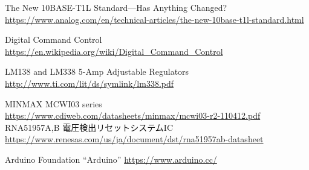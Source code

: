 \begin{thebibliography}{2}
  The New 10BASE-T1L Standard—Has Anything Changed?
  \url{https://www.analog.com/en/technical-articles/the-new-10base-t1l-standard.html}

Digital Command Control
\url{https://en.wikipedia.org/wiki/Digital_Command_Control}

  LM138 and LM338 5-Amp Adjustable Regulators
  \url{http://www.ti.com/lit/ds/symlink/lm338.pdf}

  MINMAX MCWI03 series
  \url{https://www.cdiweb.com/datasheets/minmax/mcwi03-r2-110412.pdf}
  RNA51957A,B 電圧検出リセットシステムIC
  \url{https://www.renesas.com/us/ja/document/dst/rna51957ab-datasheet}

  Arduino Foundation ``Arduino''
  \url{https://www.arduino.cc/}


\end{thebibliography}

